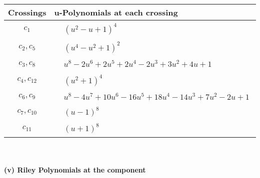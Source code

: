 \documentclass[1p]{elsarticle_modified}
\theoremstyle{definition}
\begin{document}
\begin{tabular}{m{50pt}|m{274pt}}
Crossings & \hspace{64pt}u-Polynomials at each crossing \\
\hline $$\begin{aligned}c_{1}\end{aligned}$$&$\begin{aligned}
&(u^2- u+1)^4
\end{aligned}$\\
\hline $$\begin{aligned}c_{2},c_{5}\end{aligned}$$&$\begin{aligned}
&(u^4- u^2+1)^2
\end{aligned}$\\
\hline $$\begin{aligned}c_{3},c_{8}\end{aligned}$$&$\begin{aligned}
&u^8-2 u^6+2 u^5+2 u^4-2 u^3+3 u^2+4 u+1
\end{aligned}$\\
\hline $$\begin{aligned}c_{4},c_{12}\end{aligned}$$&$\begin{aligned}
&(u^2+1)^4
\end{aligned}$\\
\hline $$\begin{aligned}c_{6},c_{9}\end{aligned}$$&$\begin{aligned}
&u^8-4 u^7+10 u^6-16 u^5+18 u^4-14 u^3+7 u^2-2 u+1
\end{aligned}$\\
\hline $$\begin{aligned}c_{7},c_{10}\end{aligned}$$&$\begin{aligned}
&(u-1)^8
\end{aligned}$\\
\hline $$\begin{aligned}c_{11}\end{aligned}$$&$\begin{aligned}
&(u+1)^8
\end{aligned}$\\
\hline
\end{tabular}\\~\\
\newpage\renewcommand{\arraystretch}{1}
\flushleft \textbf{(v) Riley Polynomials at the component}\newline \\
\end{document}

